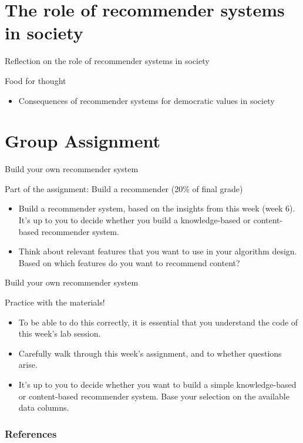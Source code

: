 \documentclass[handout]{beamer}
\begin{document}
\section[Reflection]{The role of recommender systems in society}

\begin{frame}{Reflection on the role of recommender systems in society}
	\begin{alertblock}{Food for thought}
		\begin{itemize}
			\item <1->Consequences of recommender systems for democratic values in society
		\end{itemize}
	\end{alertblock}
\end{frame}


\section[Group ass]{Group Assignment}

\begin{frame}{Build your own recommender system}
	\begin{alertblock}{Part of the assignment: Build a recommender (20\% of final grade)}
		\begin{itemize}
			\item <1->Build a recommender system, based on the insights from this week (week 6). It's up to you to decide whether you build a knowledge-based or content-based recommender system.
			\item <2->Think about relevant features that you want to use in your algorithm design. Based on which features do you want to recommend content?
		\end{itemize}
	\end{alertblock}
\end{frame}

\begin{frame}{Build your own recommender system}
	\begin{exampleblock}{Practice with the materials!}
		\begin{itemize}
			\item <3-> To be able to do this correctly, it is essential that you understand the code of this week's lab session. 
			\item <4-> Carefully walk through this week's assignment, and to whether questions arise.
			\item <5-> It's up to you to decide whether you want to build a simple knowledge-based or content-based recommender system. Base your selection on the available data columns.
		\end{itemize}
	\end{exampleblock}
\end{frame}

\begin{frame}
	\frametitle{References}
	\printbibliography
\end{frame}
\end{document}
